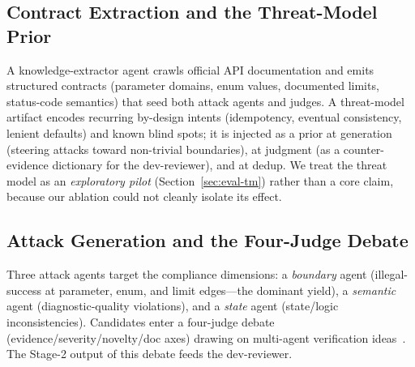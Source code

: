 \documentclass[sigconf, anonymous, review]{acmart}
\begin{document}
\subsection{Contract Extraction and the Threat-Model Prior}\label{sec:tm}
A knowledge-extractor agent crawls official API documentation and emits structured contracts (parameter domains, enum values, documented limits, status-code semantics) that seed both attack agents and judges. A threat-model artifact encodes recurring by-design intents (idempotency, eventual consistency, lenient defaults) and known blind spots; it is injected as a prior at generation (steering attacks toward non-trivial boundaries), at judgment (as a counter-evidence dictionary for the dev-reviewer), and at dedup. We treat the threat model as an \emph{exploratory pilot} (Section~\ref{sec:eval-tm}) rather than a core claim, because our ablation could not cleanly isolate its effect.

\subsection{Attack Generation and the Four-Judge Debate}
Three attack agents target the compliance dimensions: a \emph{boundary} agent (illegal-success at parameter, enum, and limit edges---the dominant yield), a \emph{semantic} agent (diagnostic-quality violations), and a \emph{state} agent (state/logic inconsistencies). Candidates enter a four-judge debate (evidence/severity/novelty/doc axes) drawing on multi-agent verification ideas~\cite{du2023improving}. The Stage-2 output of this debate feeds the dev-reviewer.
\end{document}
